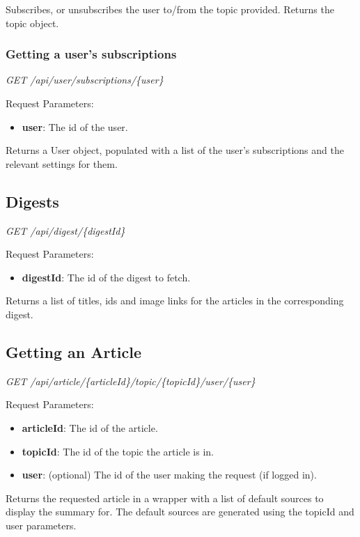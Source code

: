\documentclass[12pt]{article}
\begin{document}
\begin{appendices}
Subscribes, or unsubscribes the user to/from the topic provided. Returns the topic object.

\subsubsection{Getting a user's subscriptions}

\emph{GET	/api/user/subscriptions/\{user\}}

Request Parameters:
\begin{itemize}
	\item \textbf{user}: The id of the user.
\end{itemize}

Returns a User object, populated with a list of the user's subscriptions and the relevant settings for them.

\subsection{Digests}

\emph{GET	/api/digest/\{digestId\}}

Request Parameters:
\begin{itemize}
	\item \textbf{digestId}: The id of the digest to fetch.
\end{itemize}

Returns a list of titles, ids and image links for the articles in the corresponding digest.

\subsection{Getting an Article}

\emph{GET	/api/article/\{articleId\}/topic/\{topicId\}/user/\{user\}}

Request Parameters:
\begin{itemize}
	\item \textbf{articleId}: The id of the article.
	\item \textbf{topicId}: The id of the topic the article is in.
	\item \textbf{user}: (optional) The id of the user making the request (if logged in).
\end{itemize}

Returns the requested article in a wrapper with a list of default sources to display the summary for. The default sources are generated using the topicId and user parameters. 


\end{appendices}
\end{document}
